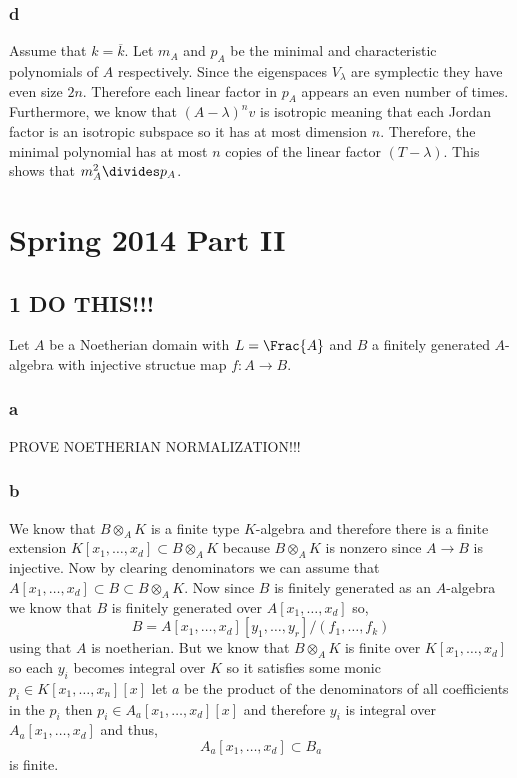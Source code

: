 \documentclass[12pt]{article}
\begin{document}
\subsubsection{d}

Assume that $k = \overline{k}$. Let $m_A$ and $p_A$ be the minimal and characteristic polynomials of $A$ respectively. Since the eigenspaces $V_\lambda$ are symplectic they have even size $2n$. Therefore each linear factor in $p_A$ appears an even number of times. Furthermore, we know that $(A - \lambda)^n v$ is isotropic meaning that each Jordan factor is an isotropic subspace so it has at most dimension $n$. Therefore, the minimal polynomial has at most $n$ copies of the linear factor $(T - \lambda)$. This shows that $m_A^2 \divides p_A$.


\section{Spring 2014 Part II}

\subsection{1 DO THIS!!!}

Let $A$ be a Noetherian domain with $L = \Frac{A}$ and $B$ a finitely generated $A$-algebra with injective structue map $f : A \to B$.

\subsubsection{a}

PROVE NOETHERIAN NORMALIZATION!!!

\subsubsection{b}

We know that $B \otimes_A K$ is a finite type $K$-algebra and therefore there is a finite extension $K[x_1, \dots, x_d] \subset B \otimes_A K$ because $B \otimes_A K$ is nonzero since $A \to B$ is injective. Now by clearing denominators we can assume that $A[x_1, \dots, x_d] \subset B \subset B \otimes_A K$. Now since $B$ is finitely generated as an $A$-algebra we know that $B$ is finitely generated over $A[x_1, \dots, x_d]$ so,
\[ B = A[x_1, \dots, x_d][y_1, \dots, y_r]/(f_1, \dots, f_k) \]
using that $A$ is noetherian. But we know that $B \otimes_A K$ is finite over $K[x_1, \dots, x_d]$ so each $y_i$ becomes integral over $K$ so it satisfies some monic $p_i \in K[x_1, \dots, x_n][x]$ let $a$ be the product of the denominators of all coefficients in the $p_i$ then $p_i \in A_a[x_1, \dots, x_d][x]$ and therefore $y_i$ is integral over $A_a[x_1, \dots, x_d]$ and thus,
\[ A_a[x_1, \dots, x_d] \subset B_a \]
is finite.
\end{document}
